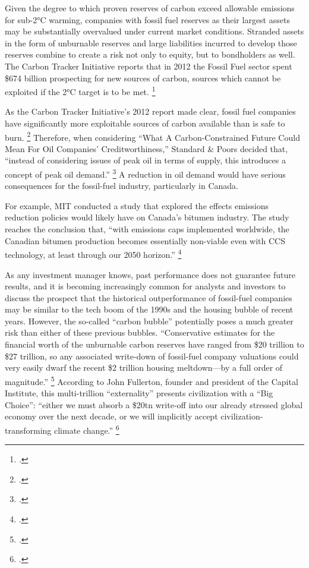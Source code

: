 Given the degree to which proven reserves of carbon exceed allowable emissions for sub-2°C warming, companies with fossil fuel reserves as their largest assets may be substantially overvalued under current market conditions. 
Stranded assets in the form of unburnable reserves and large liabilities incurred to develop those reserves combine to create a risk not only to equity, but to bondholders as well.
The Carbon Tracker Initiative reports that in 2012 the Fossil Fuel sector spent \$674 billion prospecting for new sources of carbon, sources which cannot be exploited if the 2°C target is to be met. \footcite{CTI2013}


As the Carbon Tracker Initiative's 2012 report made clear, fossil fuel companies have significantly more exploitable sources of carbon available than is safe to burn. \footcite{CTI2012}
Therefore, when considering ``What A Carbon-Constrained Future Could Mean For Oil Companies' Creditworthiness,'' Standard \& Poors decided that, ``instead of considering issues of peak oil in terms of supply, this introduces a concept of peak oil demand.'' \footcite{SandPConstrained}
A reduction in oil demand would have serious consequences for the fossil-fuel industry, particularly in Canada.


For example, MIT conducted a study that explored the effects  emissions reduction policies would likely have on Canada's bitumen industry.
The study reaches the conclusion that, ``with  emissions caps implemented worldwide, the Canadian bitumen production becomes essentially non-viable even with CCS technology, at least through our 2050 horizon.'' \footcite{MITContraints}


As any investment manager knows, past performance does not guarantee future results, and it is becoming increasingly common for analysts and investors to discuss the prospect that the historical outperformance of fossil-fuel companies may be similar to the tech boom of the 1990s and the housing bubble of recent years.
However, the so-called ``carbon bubble'' potentially poses a much greater risk than either of these previous bubbles.
``Conservative estimates for the financial worth of the unburnable carbon reserves have ranged from \$20 trillion to \$27 trillion, so any associated write-down of fossil-fuel company valuations could very easily dwarf the recent \$2 trillion housing meltdown—by a full order of magnitude.'' \footcite[][p. 3]{FossilFreeInvesting}
According to John Fullerton, founder and president of the Capital Institute, this multi-trillion ``externality'' presents civilization with a ``Big Choice'': ``either we must absorb a \$20tn write-off into our already stressed global economy over the next decade, or we will implicitly accept civilization-transforming climate change.'' \footcite{BigChoice}



